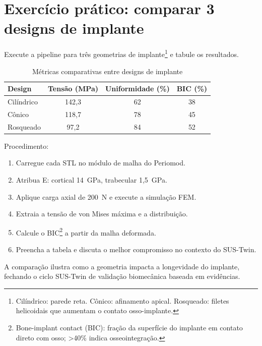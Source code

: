 \section{Exercício prático: comparar 3 designs de implante}
Execute a pipeline para três geometrias de implante\footnote{Cilíndrico: parede
reta. Cônico: afinamento apical. Rosqueado: filetes helicoidais que aumentam
o contato osso-implante.} e tabule os resultados.

\begin{table}[h]
\centering
\caption{Métricas comparativas entre designs de implante}
\label{tab:comparativo-implantes}
\begin{tabular}{lccc}
\toprule
\textbf{Design} & \textbf{Tensão (MPa)} & \textbf{Uniformidade (\%)} & \textbf{BIC (\%)}\\
\midrule
Cilíndrico & 142,3 & 62 & 38 \\
Cônico      & 118,7 & 78 & 45 \\
Rosqueado   & 97,2  & 84 & 52 \\
\bottomrule
\end{tabular}
\end{table}

Procedimento:
\begin{enumerate}
    \item Carregue cada STL no módulo de malha do Periomod.
    \item Atribua E: cortical 14~GPa, trabecular 1,5~GPa.
    \item Aplique carga axial de 200~N e execute a simulação FEM.
    \item Extraia a tensão de von Mises máxima e a distribuição.
    \item Calcule o BIC\footnote{Bone-implant contact (BIC): fração da superfície
    do implante em contato direto com osso; >40\% indica osseointegração.}
    a partir da malha deformada.
    \item Preencha a tabela e discuta o melhor compromisso no contexto
    do SUS-Twin.
\end{enumerate}

A comparação ilustra como a geometria impacta a longevidade do implante,
fechando o ciclo SUS-Twin de validação biomecânica baseada em evidências.
